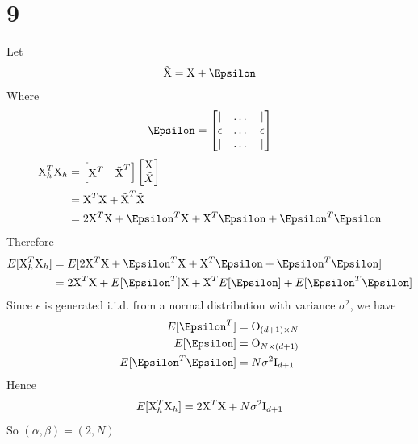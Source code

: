 \documentclass[11pt]{article}
\let\mathbb\relax
\theoremstyle{definition}
\begin{document}
\section*{9}
Let
\begin{align*}
  \tilde{\text{X}} = \text{X} + \Epsilon
\end{align*}
Where
\begin{align*}
  \Epsilon = 
  \begin{bmatrix}
    | & \dots & | \\
    \epsilon &\dots&\epsilon \\
    | & \dots & | \\
  \end{bmatrix}
\end{align*}
\begin{align*}
  \text{X}_h^T\text{X}_h &= 
  \begin{bmatrix}
    \text{X}^T & \tilde{\text{X}}^T
  \end{bmatrix}
  \begin{bmatrix}
    \text{X} \\ 
    \tilde{X} \\
  \end{bmatrix} \\
  &= \text{X}^T\text{X} +  \tilde{\text{X}}^T\tilde{\text{X}} \\ 
  &= 2\text{X}^T\text{X} + \Epsilon^T\text{X} + \text{X}^T\Epsilon + \Epsilon^T\Epsilon
\end{align*}
Therefore 
\begin{align*}
  \mathbb{E}[\text{X}_h^T\text{X}_h] &= \mathbb{E}[2\text{X}^T\text{X} + \Epsilon^T\text{X} + \text{X}^T\Epsilon + \Epsilon^T\Epsilon] \\ 
  &= 2\text{X}^T\text{X} + \mathbb{E}[\Epsilon^T]\text{X} + \text{X}^T\mathbb{E}[\Epsilon] + \mathbb{E}[\Epsilon^T\Epsilon]
\end{align*}
Since $\epsilon$ is generated i.i.d. from a normal distribution with variance $\sigma^2$, we have
\begin{align*}
  \mathbb{E}[\Epsilon^T] &= \text{O}_{(d + 1)\times N} \\
  \mathbb{E}[\Epsilon] &= \text{O}_{N\times(d + 1)} \\ 
  \mathbb{E}[\Epsilon^T\Epsilon] &= N\sigma^2\text{I}_{d + 1}
\end{align*}
Hence 
\begin{align*}
  \mathbb{E}[\text{X}_h^T\text{X}_h] = 2\text{X}^T\text{X} + N\sigma^2\text{I}_{d + 1}
\end{align*}
So $(\alpha, \beta) = (2, N)$
\newpage
\end{document}
